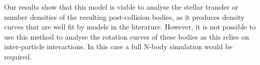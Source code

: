 \documentclass[10pt, twocolumn]{revtex4}    %
\begin{document}
Our results show that this model is viable to analyse the stellar transfer or number densities of the resulting post-collision bodies, as it produces density curves that are well fit by models in the literature. However, it is not possible to use this method to analyse the rotation curves of these bodies as this relies on inter-particle interactions. In this case a full N-body simulation would be required.

\vspace{1ex}
%
%
%
\normalem


%
%


\end{document}
